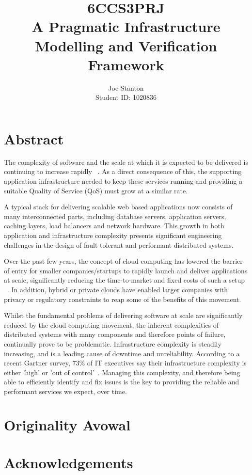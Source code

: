 \documentclass{cshonours}
\title{6CCS3PRJ \\\vspace{0.5cm}
  A Pragmatic Infrastructure Modelling and Verification Framework}
\author{Joe Stanton\\\vspace{0.5cm}
  Student ID: 1020836
}
\begin{document}
\maketitle

\chapter*{Abstract}
The complexity of software and the scale at which it is expected to be delivered is continuing to increase rapidly ~\cite{SoftwareComplexity}.
As a direct consequence of this, the supporting application infrastructure needed to keep these services running and providing a suitable Quality of Service (QoS) must grow at a similar rate.

A typical stack for delivering scalable web based applications now consists of many interconnected parts, including database servers, application servers, caching layers, load balancers and network hardware.
This growth in both application and infrastructure complexity presents significant engineering challenges in the design of fault-tolerant and performant distributed systems.

Over the past few years, the concept of cloud computing has lowered the barrier of entry for smaller companies/startups to rapidly launch and deliver applications at scale, significantly reducing the time-to-market and fixed costs of such a setup ~\cite{CloudComputing}.
In addition, hybrid or private clouds have enabled larger companies with privacy or regulatory constraints to reap some of the benefits of this movement.

Whilst the fundamental problems of delivering software at scale are significantly reduced by the cloud computing movement, the inherent complexities of distributed systems with many components and therefore points of failure, continually prove to be problematic. Infrastructure complexity is steadily increasing, and is a leading cause of downtime and unreliability. According to a recent Gartner survey, 73\% of IT executives say their infrastructure complexity is either 'high' or 'out of control’~\cite{Gartner2013}. Managing this complexity, and therefore being able to efficiently identify and fix issues is the key to providing the reliable and performant services we expect, over time.

\chapter*{Originality Avowal}
\chapter*{Acknowledgements}
\end{document}
